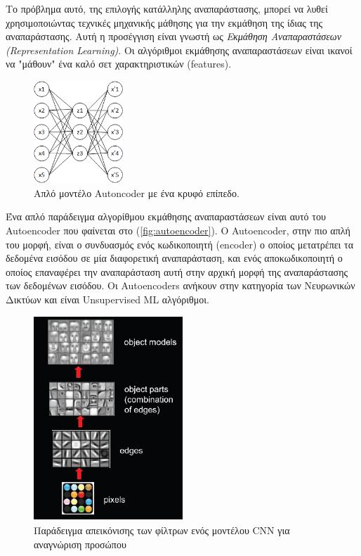 Το πρόβλημα αυτό, της επιλογής κατάλληλης αναπαράστασης, μπορεί να λυθεί
χρησιμοποιώντας τεχνικές μηχανικής μάθησης για την εκμάθηση της ίδιας
της αναπαράστασης. Αυτή η προσέγγιση είναι γνωστή ως
\emph{Εκμάθηση Αναπαραστάσεων (Representation Learning)}. Οι αλγόριθμοι
εκμάθησης αναπαραστάσεων είναι ικανοί να "μάθουν" ένα καλό σετ χαρακτηριστικών (features).
\begin{figure}[!ht]
  \centering
  \includegraphics[width=0.3\textwidth]{./images/chapter3/autoencoder.png}
  \caption[Απλό μοντέλο Autoncoder με ένα κρυφό επίπεδο]{Απλό μοντέλο Autoncoder με ένα κρυφό επίπεδο.}
  \label{fig:autoencoder}
\end{figure}
Ένα απλό παράδειγμα αλγορίθμου εκμάθησης αναπαραστάσεων είναι αυτό του
Autoencoder \cite{baldi2012autoencoders} που φαίνεται στο (\autoref{fig:autoencoder}).
Ο Autoencoder, στην πιο απλή του μορφή, είναι ο συνδυασμός ενός κωδικοποιητή (encoder) ο οποίος μετατρέπει
τα δεδομένα εισόδου σε μία διαφορετική αναπαράσταση, και ενός αποκωδικοποιητή
ο οποίος επαναφέρει την αναπαράσταση αυτή στην αρχική μορφή της αναπαράστασης των
δεδομένων εισόδου. Οι Autoencoders ανήκουν στην κατηγορία των Νευρωνικών
Δικτύων και είναι Unsupervised ML αλγόριθμοι.
\begin{figure}[!ht]
  \centering
  \includegraphics[width=0.5\textwidth]{./images/chapter3/cnn_deeper.jpg}
  \caption[Παράδειγμα απεικόνισης των φίλτρων ενός μοντέλου CNN για αναγνώριση προσώπου]{Παράδειγμα απεικόνισης των φίλτρων ενός μοντέλου CNN για αναγνώριση προσώπου}
  \label{fig:cnn_filter_visualization}
\end{figure}
